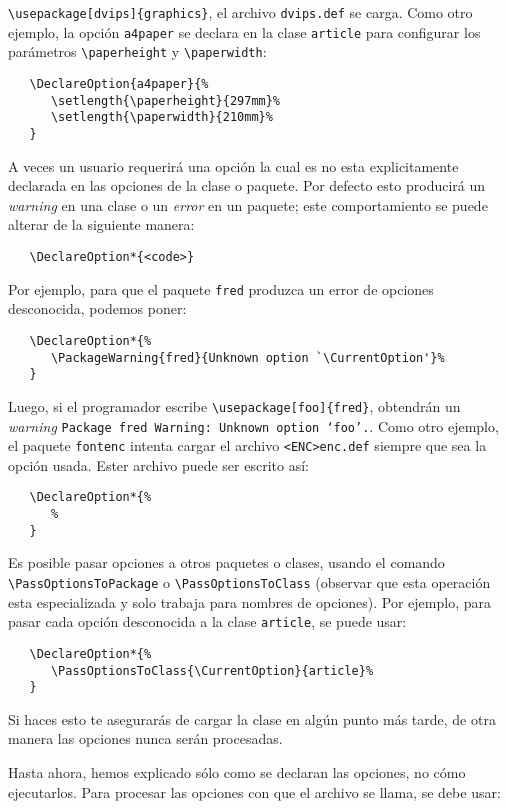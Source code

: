 \verb|\usepackage[dvips]{graphics}|, el archivo \verb|dvips.def| se carga. Como otro ejemplo, la opción \verb|a4paper| se declara en la clase \verb|article| para configurar los parámetros \verb|\paperheight| y \verb|\paperwidth|:

\begin{verbatim}
   \DeclareOption{a4paper}{%
      \setlength{\paperheight}{297mm}%
      \setlength{\paperwidth}{210mm}%
   }
\end{verbatim}
A veces un usuario requerirá una opción la cual es no esta explicitamente declarada en las opciones de la clase o paquete. Por defecto esto producirá un \textit{warning} en una clase o un \textit{error} en un paquete; este comportamiento se puede alterar de la siguiente manera:

\begin{verbatim}
   \DeclareOption*{<code>}
\end{verbatim}
Por ejemplo, para que el paquete \verb|fred| produzca un error de opciones desconocida, podemos poner:
\begin{verbatim}
   \DeclareOption*{%
      \PackageWarning{fred}{Unknown option `\CurrentOption'}%
   }
\end{verbatim}
Luego, si el programador escribe \verb|\usepackage[foo]{fred}|, obtendrán un \textit{warning} \texttt{Package fred Warning: Unknown option `foo'.}. Como otro ejemplo, el paquete \verb|fontenc| intenta cargar el archivo \verb|<ENC>enc.def| siempre que sea  la opción usada. Ester archivo puede ser escrito así:

\begin{verbatim}
   \DeclareOption*{%
      %
   }
\end{verbatim}
Es posible pasar opciones a otros paquetes o clases, usando el comando \verb|\PassOptionsToPackage| o \verb|\PassOptionsToClass| (observar que esta operación esta especializada y solo trabaja para nombres de opciones). Por ejemplo, para pasar cada opción desconocida a la clase \verb|article|, se puede usar:

\begin{verbatim}
   \DeclareOption*{%
      \PassOptionsToClass{\CurrentOption}{article}%
   }
\end{verbatim}
Si haces esto te asegurarás de cargar la clase en algún punto más tarde, de otra manera las opciones nunca serán procesadas.

	
Hasta ahora, hemos explicado sólo  como se declaran las opciones, no cómo
ejecutarlos. Para procesar las opciones con que el archivo se llama,
se debe usar:

